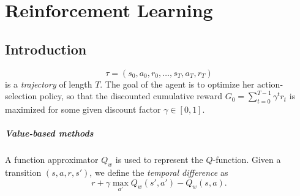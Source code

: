 \documentclass[../main.tex]{subfiles}
\begin{document}
\chapter{Reinforcement Learning}

\section{Introduction}

\[
\tau = (s_0,a_0,r_0, \ldots ,s_{T}, a_{T}, r_{T})
\]
is a \emph{trajectory} of length $T$. The goal of the agent is to optimize her action-selection
policy, so that the discounted cumulative reward $G_0 = \sum_{t=0}^{T-1}\gamma^{t}r_t$ is maximized for some given discount 
factor $\gamma \in [0,1]$.

\paragraph{Value-based methods}

A function approximator $Q_{w}$ is used to represent the $Q$-function. Given a transition $(s,a,r,s')$, we define the \emph{temporal difference} as 
\[
r + \gamma \max_{a'}Q_{w}(s',a') - Q_{w}(s,a).
\]
\end{document}
